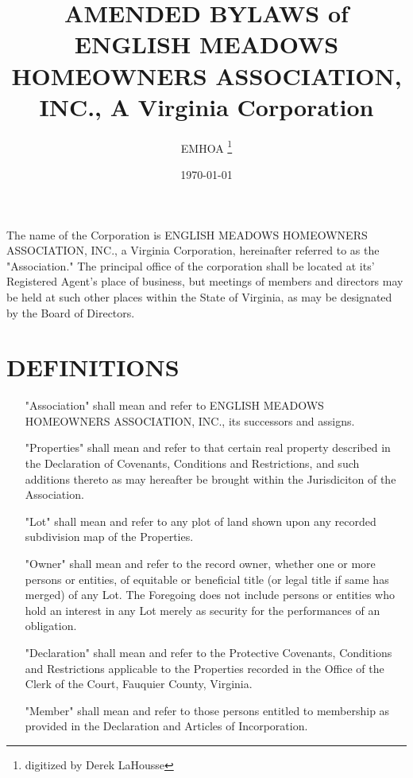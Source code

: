 \documentclass[12pt, letterpaper]{article}
\title{AMENDED BYLAWS of ENGLISH MEADOWS HOMEOWNERS ASSOCIATION, INC., A Virginia Corporation}
\author{EMHOA \thanks{digitized by Derek LaHousse}}
\date{\today}
\begin{document}
\maketitle

\tableofcontents

\section{}
The name of the Corporation is ENGLISH MEADOWS HOMEOWNERS ASSOCIATION, INC., a Virginia Corporation, hereinafter referred to as the "Association."
The principal office of the corporation shall be located at its' Registered Agent's place of business, but meetings of members and directors may be held at such other places within the State of Virginia, as may be designated by the Board of Directors.

\section{DEFINITIONS}
\begin{enumerate}
 \item["Association"] shall mean and refer to ENGLISH MEADOWS HOMEOWNERS ASSOCIATION, INC., its successors and assigns.
 \item["Properties"] shall mean and refer to that certain real property described in the Declaration of Covenants, Conditions and Restrictions, and such additions thereto as may hereafter be brought within the Jurisdiciton of the Association.
 \item["Lot"] shall mean and refer to any plot of land shown upon any recorded subdivision map of the Properties.
 \item["Owner"] shall mean and refer to the record owner, whether one or more persons or entities, of equitable or beneficial title (or legal title if same has merged) of any Lot.
  The Foregoing does not include persons or entities who hold an interest in any Lot merely as security for the performances of an obligation.
 \item["Declaration"] shall mean and refer to the Protective Covenants, Conditions and Restrictions applicable to the Properties recorded in the Office of the Clerk of the Court, Fauquier County, Virginia.
 \item["Member"] shall mean and refer to those persons entitled to membership as provided in the Declaration and Articles of Incorporation.
\end{enumerate}
\end{document}
